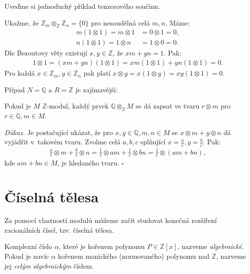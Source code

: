 \documentclass[12pt]{report}
\begin{document}
Uveďme si jednoduchý příklad tenzorového součinu. 

\begin{priklad}
Ukažme, že $\mathbb{Z}_m \otimes_{\mathbb{Z}} \mathbb{Z}_n = \lbrace 0 \rbrace$ pro nesoudělná celá $m,n$. Máme:
\begin{align*}
m (1 \otimes 1) = m \otimes 1  &= 0 \otimes 1 = 0,\\
n (1 \otimes 1) = 1 \otimes n &= 1 \otimes 0 = 0.
\end{align*}
Dle Bezoutovy věty existují $x,y \in \mathbb{Z}$, že $xm + yn = 1$. Pak:
\begin{align*}
1 \otimes 1 = (xm+yn)(1 \otimes 1) = xm (1 \otimes 1) + yn (1 \otimes 1) = 0.
\end{align*}
Pro každá $x \in \mathbb{Z}_m, y \in \mathbb{Z}_n$ pak platí $x \otimes y = x(1 \otimes y) = xy (1 \otimes 1)  = 0$.
\end{priklad}

Případ $N = \mathbb{Q}$ a $R = \mathbb{Z}$ je zajímavější:

\begin{veta}\label{qtensor}
Pokud je $M$ $\mathbb{Z}$-modul, každý prvek $\mathbb{Q} \otimes_{\mathbb{Z}} M$ se dá zapsat ve tvaru $r \otimes m$ pro $r \in \mathbb{Q}, m \in M$.
\end{veta}

\textit{Důkaz.} Je postačující ukázat, že pro $x,y \in \mathbb{Q}, m,n \in M$ se $x \otimes m + y \otimes n$ dá vyjádřit v~takovém tvaru. Zvolme celá $a,b,c$ splňující $x = \frac{a}{c}, y = \frac{b}{c}$. Pak:
\begin{align*}
\frac{a}{c} \otimes m + \frac{b}{c} \otimes n = \frac{1}{c} \otimes am + \frac{1}{c} \otimes bn = \frac{1}{c} \otimes (am+bn),
\end{align*}
kde $am+bn \in M$, je hledaného tvaru. \hfill $\square$



\section{Číselná tělesa}

Za pomocí vlastností modulů můžeme začít studovat konečná rozšíření racionálních čísel, tzv. číselná tělesa.

\begin{definice}
Komplexní číslo $\alpha$, které je kořenem polynomu $P \in \mathbb{Z}[x]$, nazveme \textit{algebraické}. Pokud je navíc $\alpha$ kořenem monického (normovaného) polynomu nad $\mathbb{Z}$, nazveme jej \textit{celým algebraickým} číslem.
\end{definice}
\end{document}
